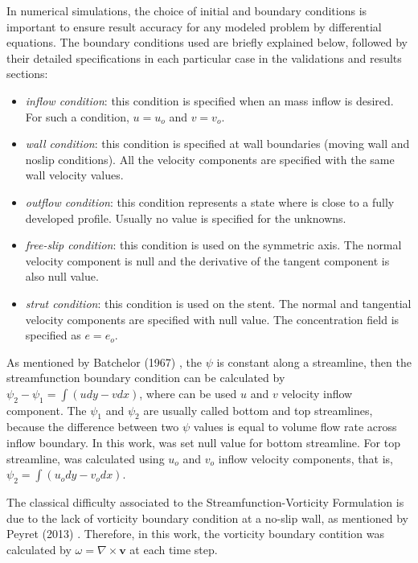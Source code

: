 In numerical simulations, the choice of initial and boundary conditions
is important to ensure result accuracy for any modeled problem 
by differential equations. 
The boundary conditions used
are briefly explained below, 
followed by their detailed specifications 
in each particular case in the validations and results sections:

\begin{itemize}
 \item \textit{inflow condition}:
 this condition is specified when an mass inflow is desired.
 For such a condition, $u = u_{o}$
 and $v = v_{o}$.

 \item \textit{wall condition}:
 this condition is specified at wall boundaries (moving wall
 and noslip conditions).
 All the velocity components are specified with 
 the same wall velocity values.

 \item \textit{outflow condition}: 
 this condition represents a state where is close to a
 fully developed profile.
 Usually no value is specified for the unknowns.

 \item \textit{free-slip condition}: 
 this condition is used on the symmetric axis.
 The normal velocity component is null and the derivative of
 the tangent component is also null value.

 \item \textit{strut condition}: 
 this condition is used on the stent. The normal and tangential
 velocity components are specified with null value. 
 The concentration field is specified as $e=e_{o}$.
\end{itemize}

As mentioned by Batchelor (1967) \cite{batchelor1967},
the $\psi$ is constant along a streamline, then
the streamfunction boundary condition can be calculated by
$\psi_{2} - \psi_{1} = \int \left(udy - vdx\right)$,
where can be used $u$ and $v$ velocity inflow component.
The $\psi_{1}$ and $\psi_{2}$ are usually called 
bottom and top streamlines, because the difference
between two $\psi$ values is equal to volume flow
rate across inflow boundary. In this work, was set
null value for bottom streamline. For top streamline,
was calculated using $u_{o}$ and $v_{o}$ inflow velocity
components, that is, $\psi_{2} = \int \left(u_{o}dy - v_{o}dx\right)$.

\medskip
The classical difficulty associated to the
Streamfunction-Vorticity Formulation is due to the lack of vorticity
boundary condition at a no-slip wall, as mentioned by Peyret (2013)
 \cite{peyret2013}.
Therefore, in this work, the vorticity boundary contition
was calculated by $\omega = \nabla \times \textbf{v}$
at each time step.
